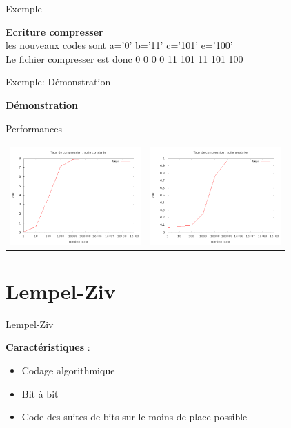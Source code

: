 \documentclass[french]{beamer}
\begin{document}
\begin{frame}{Exemple}
\begin{center}

\textbf{Ecriture compresser}\\
les nouveaux codes sont a='0' b='11' c='101' e='100'\\
Le fichier compresser est donc 0 0 0 0 11 101 11 101 100

\end{center}
\end{frame}

\begin{frame}{Exemple: Démonstration}
	\begin{center}
	\textbf{Démonstration}
	\end{center}
\end{frame}

\begin{frame}{Performances}
	\begin{center}
	\begin{tabular}{l | l}
	\includegraphics[width=5cm]{HConstant.png} & 
	\includegraphics[width=5cm]{aleaH.png}
	\end{tabular}
	\end{center}
\end{frame}

\section{Lempel-Ziv}
\begin{frame}{Lempel-Ziv}
	\begin{center}
	\textbf{Caractéristiques} :
	\begin{itemize}
	\item<2-4>  Codage algorithmique
	\item<3-4>  Bit à bit 
	\item <4>  Code des suites de bits sur le moins de place possible
	\end{itemize}
	\end{center}
\end{frame}
\end{document}
